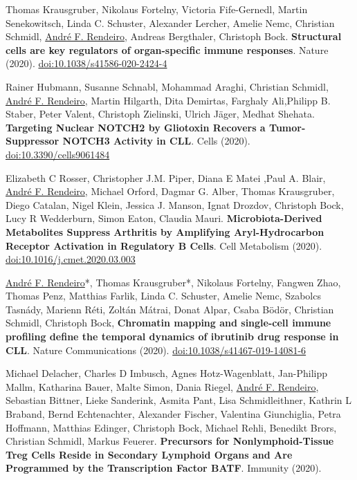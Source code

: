 \documentclass[11pt,a4paper,roman]{moderncv} %
\begin{document}
        \begin{etaremune}[leftmargin=1.0cm, itemindent=0pt, topsep=10pt, itemsep=2pt, partopsep=0pt, parsep=0pt]
        \item Thomas Krausgruber, Nikolaus Fortelny, Victoria Fife-Gernedl, Martin Senekowitsch, Linda C. Schuster, Alexander Lercher, Amelie Nemc, Christian Schmidl, \underline{André F. Rendeiro}, Andreas Bergthaler, Christoph Bock. \textbf{Structural cells are key regulators of organ-specific immune responses}. Nature (2020).
        \href{https://dx.doi.org/10.1038/s41586-020-2424-4}{doi:10.1038/s41586-020-2424-4}
        \item Rainer Hubmann, Susanne Schnabl, Mohammad Araghi, Christian Schmidl, \underline{André F. Rendeiro}, Martin Hilgarth, Dita Demirtas, Farghaly Ali,Philipp B. Staber, Peter Valent, Christoph Zielinski, Ulrich Jäger, Medhat Shehata. \textbf{Targeting Nuclear NOTCH2 by Gliotoxin Recovers a Tumor-Suppressor NOTCH3 Activity in CLL}. Cells (2020).
        \href{http://dx.doi.org/10.3390/cells9061484}{doi:10.3390/cells9061484}
        \item Elizabeth C Rosser, Christopher J.M. Piper, Diana E Matei ,Paul A. Blair, \underline{André F. Rendeiro}, Michael Orford, Dagmar G. Alber, Thomas Krausgruber, Diego Catalan, Nigel Klein, Jessica J. Manson, Ignat Drozdov, Christoph Bock, Lucy R Wedderburn, Simon Eaton, Claudia Mauri. \textbf{Microbiota-Derived Metabolites Suppress Arthritis by Amplifying Aryl-Hydrocarbon Receptor Activation in Regulatory B Cells}. Cell Metabolism (2020).
        \href{https://dx.doi.org/10.1016/j.cmet.2020.03.003}{doi:10.1016/j.cmet.2020.03.003}
        \item \underline{André F. Rendeiro}*, Thomas Krausgruber*, Nikolaus Fortelny, Fangwen Zhao, Thomas Penz, Matthias Farlik, Linda C. Schuster, Amelie Nemc, Szabolcs Tasnády, Marienn Réti, Zoltán Mátrai, Donat Alpar, Csaba Bödör, Christian Schmidl, Christoph Bock, \textbf{Chromatin mapping and single-cell immune profiling define the temporal dynamics of ibrutinib drug response in CLL}. Nature Communications (2020).
        \href{https://dx.doi.org/10.1038/s41467-019-14081-6}{doi:10.1038/s41467-019-14081-6}
        \item Michael Delacher, Charles D Imbusch, Agnes Hotz-Wagenblatt, Jan-Philipp Mallm, Katharina Bauer, Malte Simon, Dania Riegel, \underline{André F. Rendeiro}, Sebastian Bittner, Lieke Sanderink, Asmita Pant, Lisa Schmidleithner, Kathrin L Braband, Bernd Echtenachter, Alexander Fischer, Valentina Giunchiglia, Petra Hoffmann, Matthias Edinger, Christoph Bock, Michael Rehli, Benedikt Brors, Christian Schmidl, Markus Feuerer. \textbf{Precursors for Nonlymphoid-Tissue Treg Cells Reside in Secondary Lymphoid Organs and Are Programmed by the Transcription Factor BATF}. Immunity (2020).

\end{etaremune}
\end{document}
